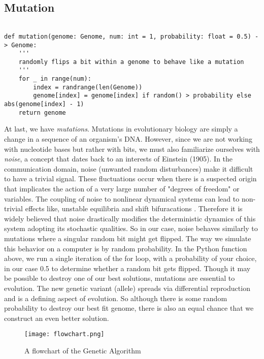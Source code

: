 \subsection{Mutation}
\label{mutations}

\begin{lstlisting}

def mutation(genome: Genome, num: int = 1, probability: float = 0.5) -> Genome:
    '''
    randomly flips a bit within a genome to behave like a mutation
    '''
    for _ in range(num):
        index = randrange(len(Genome))
        genome[index] = genome[index] if random() > probability else abs(genome[index] - 1)
    return genome

\end{lstlisting} 

At last, we have \emph{mutations}. Mutations in evolutionary biology are simply a change in a sequence of an organism's DNA. However, since we are not working with nucleotide bases but rather with bits, we must also familiarize ourselves with \emph{noise}, a concept that dates back to an interests of Einstein (1905). In the communication domain, noise (unwanted random disturbances) make it difficult to have a trivial signal. These fluctuations occur when there is a suspected origin that implicates the action of a very large number of "degrees of freedom" or variables. The coupling of noise to nonlinear dynamical systems can lead to non-trivial effects like, unstable equilibria and shift bifuracations \cite{Gammaitoni}. Therefore it is widely believed that noise drastically modifies the deterministic dynamics of this system adopting its stochastic qualities. So in our case, noise behaves similarly to mutations where a singular random bit might get flipped. The way we simulate this behavior on a computer is by random probability. In the Python function above, we run a single iteration of the for loop, with a probability of your choice, in our case 0.5 to determine whether a random bit gets flipped. Though it may be possible to destroy one of our best solutions, mutations are essential to evolution. The new genetic variant (allele) spreads via differential reproduction and is a defining aspect of evolution. So although there is some random probability to destroy our best fit genome, there is also an equal chance that we construct an even better solution. 

\begin{figure}[h]
\centering
\texttt{[image: flowchart.png]}
\caption{A flowchart of the Genetic Algorithm \cite{Gutierrez-Navaro}}
\end{figure}

